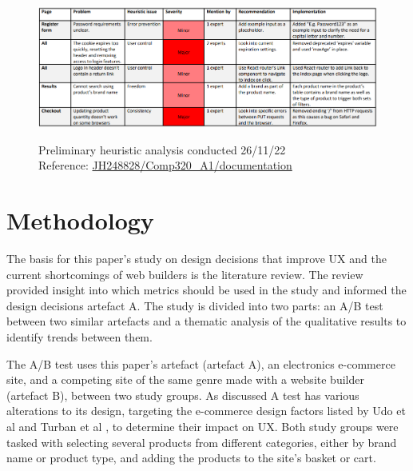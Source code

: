 \documentclass[article]{IEEEtran}
\begin{document}
            \begin{figure}[h]
                \caption{Preliminary heuristic analysis conducted 26/11/22 \\\hspace{\textwidth} Reference: \href{https://github.falmouth.ac.uk/JH248828/Comp320_A1-Comp360_A1/tree/documentation/hueristics}{JH248828/Comp320\_A1/documentation}}
                \includegraphics[width=\columnwidth]{images/testing/heuristic-analysis.png}
                \label{fig:preliminary-heuristic-analysis}
            \end{figure}
    
    \section{Methodology}
        The basis for this paper's study on design decisions that improve UX and the current shortcomings of web builders is the literature review. The review provided insight into which metrics should be used in the study and informed the design decisions artefact A. The study is divided into two parts: an A/B test between two similar artefacts and a thematic analysis of the qualitative results to identify trends between them.
        
        The A/B test uses this paper's artefact (artefact A), an electronics e-commerce site, and a competing site of the same genre made with a website builder (artefact B), between two study groups. As discussed A test has various alterations to its design, targeting the e-commerce design factors listed by Udo et al \cite{udo} and Turban et al \cite{turban}, to determine their impact on UX. Both study groups were tasked with selecting several products from different categories, either by brand name or product type, and adding the products to the site's basket or cart.
        
\end{document}

